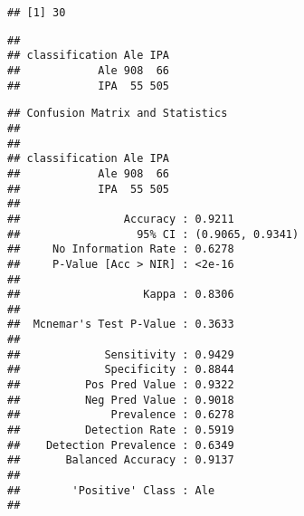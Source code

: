 \documentclass[
]{article}
\newenvironment{Shaded}{\begin{snugshade}}{\end{snugshade}}
\newcommand{\AttributeTok}[1]{\textcolor[rgb]{0.77,0.63,0.00}{#1}}
\newcommand{\CommentTok}[1]{\textcolor[rgb]{0.56,0.35,0.01}{\textit{#1}}}
\newcommand{\ConstantTok}[1]{\textcolor[rgb]{0.00,0.00,0.00}{#1}}
\newcommand{\DecValTok}[1]{\textcolor[rgb]{0.00,0.00,0.81}{#1}}
\newcommand{\FunctionTok}[1]{\textcolor[rgb]{0.00,0.00,0.00}{#1}}
\newcommand{\NormalTok}[1]{#1}
\newcommand{\OtherTok}[1]{\textcolor[rgb]{0.56,0.35,0.01}{#1}}
\newcommand{\SpecialCharTok}[1]{\textcolor[rgb]{0.00,0.00,0.00}{#1}}
\begin{document}
\begin{verbatim}
## [1] 30
\end{verbatim}

\begin{Shaded}
\end{Shaded}

\begin{verbatim}
##               
## classification Ale IPA
##            Ale 908  66
##            IPA  55 505
\end{verbatim}

\begin{Shaded}
\end{Shaded}

\begin{verbatim}
## Confusion Matrix and Statistics
## 
##               
## classification Ale IPA
##            Ale 908  66
##            IPA  55 505
##                                           
##                Accuracy : 0.9211          
##                  95% CI : (0.9065, 0.9341)
##     No Information Rate : 0.6278          
##     P-Value [Acc > NIR] : <2e-16          
##                                           
##                   Kappa : 0.8306          
##                                           
##  Mcnemar's Test P-Value : 0.3633          
##                                           
##             Sensitivity : 0.9429          
##             Specificity : 0.8844          
##          Pos Pred Value : 0.9322          
##          Neg Pred Value : 0.9018          
##              Prevalence : 0.6278          
##          Detection Rate : 0.5919          
##    Detection Prevalence : 0.6349          
##       Balanced Accuracy : 0.9137          
##                                           
##        'Positive' Class : Ale             
## 
\end{verbatim}
\end{document}
